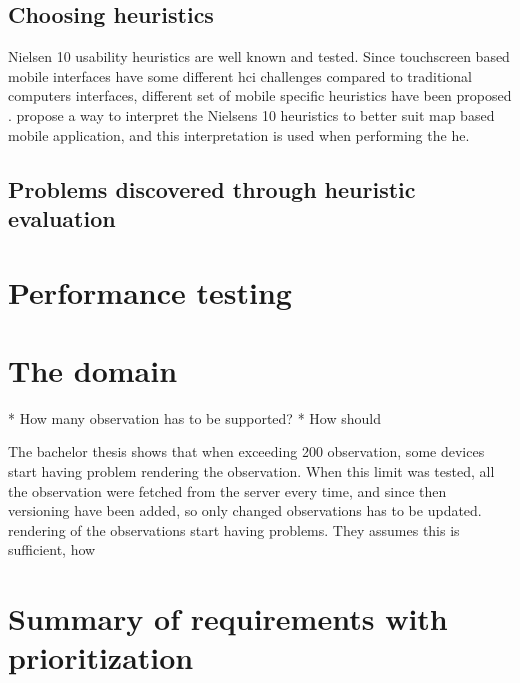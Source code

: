 \subsection{Choosing heuristics}
Nielsen 10 usability heuristics \cite{10_heuristics_nielsen} are well known and tested. Since touchscreen based mobile interfaces have some different \gls{hci} challenges compared to traditional computers interfaces, different set of mobile specific heuristics have been proposed\cite{kuparinen_mobile_he} \cite{usability_mobile_bertini} \cite{10_mobile_he}. \cite{kuparinen_mobile_he} propose a way to interpret the Nielsens 10 heuristics to better suit map based mobile application, and this interpretation is used when performing the \gls{he}.

\subsection{Problems discovered through heuristic evaluation}

\section{Performance testing}
\section{The domain}
* How many observation has to be supported?
* How should

The bachelor thesis \cite{gudmundsen_communication_2016} shows that when exceeding 200 observation, some devices start having problem rendering the observation. When this limit was tested, all the observation were fetched from the server every time, and since then versioning have been added, so only changed observations has to be updated.  rendering of the observations start having problems. They assumes this is sufficient, how

\section{Summary of requirements with prioritization}\label{sec:analysis_summary}

